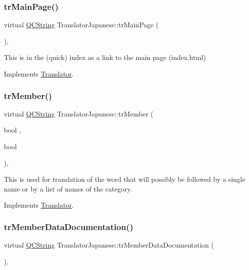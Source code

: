 \subsubsection{\texorpdfstring{trMainPage()}{trMainPage()}}
{\footnotesize\ttfamily virtual \mbox{\hyperlink{class_q_c_string}{Q\+C\+String}} Translator\+Japanese\+::tr\+Main\+Page (\begin{DoxyParamCaption}{ }\end{DoxyParamCaption})\hspace{0.3cm}{\ttfamily [inline]}, {\ttfamily [virtual]}}

This is in the (quick) index as a link to the main page (index.\+html) 

Implements \mbox{\hyperlink{class_translator}{Translator}}.

\mbox{\label{class_translator_japanese_a1ac54c351748990e35f5a3774e58216e}} 
\subsubsection{\texorpdfstring{trMember()}{trMember()}}
{\footnotesize\ttfamily virtual \mbox{\hyperlink{class_q_c_string}{Q\+C\+String}} Translator\+Japanese\+::tr\+Member (\begin{DoxyParamCaption}\item[{bool}]{,  }\item[{bool}]{ }\end{DoxyParamCaption})\hspace{0.3cm}{\ttfamily [inline]}, {\ttfamily [virtual]}}

This is used for translation of the word that will possibly be followed by a single name or by a list of names of the category. 

Implements \mbox{\hyperlink{class_translator}{Translator}}.

\mbox{\label{class_translator_japanese_aaafcf0473aaba6a49c204f9ca9d9f4f5}} 
\subsubsection{\texorpdfstring{trMemberDataDocumentation()}{trMemberDataDocumentation()}}
{\footnotesize\ttfamily virtual \mbox{\hyperlink{class_q_c_string}{Q\+C\+String}} Translator\+Japanese\+::tr\+Member\+Data\+Documentation (\begin{DoxyParamCaption}{ }\end{DoxyParamCaption})\hspace{0.3cm}{\ttfamily [inline]}, {\ttfamily [virtual]}}


